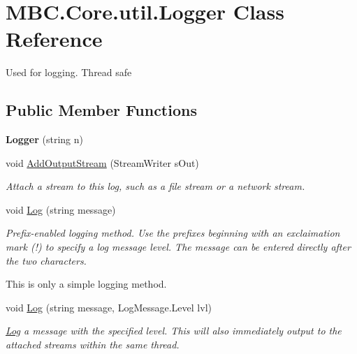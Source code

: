 \hypertarget{class_m_b_c_1_1_core_1_1util_1_1_logger}{\section{M\-B\-C.\-Core.\-util.\-Logger Class Reference}
\label{class_m_b_c_1_1_core_1_1util_1_1_logger}
}


Used for logging. Thread safe 


\subsection*{Public Member Functions}
\begin{DoxyCompactItemize}
\item 
\hypertarget{class_m_b_c_1_1_core_1_1util_1_1_logger_ac2fdea5c1750f1dbc63fefde8bb0e12f}{{\bfseries Logger} (string n)}\label{class_m_b_c_1_1_core_1_1util_1_1_logger_ac2fdea5c1750f1dbc63fefde8bb0e12f}

\item 
\hypertarget{class_m_b_c_1_1_core_1_1util_1_1_logger_a21316aef85df8eb5decf285c50badfdc}{void \hyperlink{class_m_b_c_1_1_core_1_1util_1_1_logger_a21316aef85df8eb5decf285c50badfdc}{Add\-Output\-Stream} (Stream\-Writer s\-Out)}\label{class_m_b_c_1_1_core_1_1util_1_1_logger_a21316aef85df8eb5decf285c50badfdc}

\begin{DoxyCompactList}\small\item\em Attach a stream to this log, such as a file stream or a network stream.\end{DoxyCompactList}\item 
void \hyperlink{class_m_b_c_1_1_core_1_1util_1_1_logger_a9dbb38c93a6869f689516e8f3854981d}{Log} (string message)
\begin{DoxyCompactList}\small\item\em Prefix-\/enabled logging method. Use the prefixes beginning with an exclaimation mark (!) to specify a log message level. The message can be entered directly after the two characters.\par
 This is only a simple logging method.\par
 \end{DoxyCompactList}\item 
\hypertarget{class_m_b_c_1_1_core_1_1util_1_1_logger_ae4b2c81601b3af0189ca50c834268826}{void \hyperlink{class_m_b_c_1_1_core_1_1util_1_1_logger_ae4b2c81601b3af0189ca50c834268826}{Log} (string message, Log\-Message.\-Level lvl)}\label{class_m_b_c_1_1_core_1_1util_1_1_logger_ae4b2c81601b3af0189ca50c834268826}

\begin{DoxyCompactList}\small\item\em \hyperlink{class_m_b_c_1_1_core_1_1util_1_1_log}{Log} a message with the specified level. This will also immediately output to the attached streams within the same thread.\end{DoxyCompactList}\end{DoxyCompactItemize}


